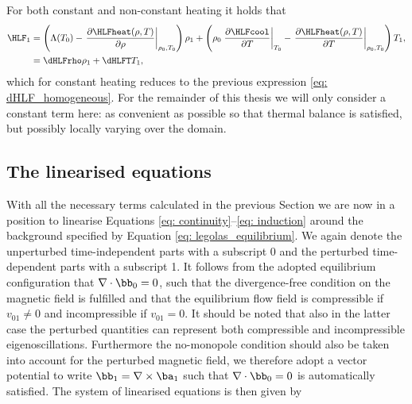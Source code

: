 For both constant and non-constant heating it holds that
\begin{equation} \label{eq: perturbed_HLF}
  \begin{aligned}
    \HLF_1 &= \left(
      \Lambda(T_0) - \left.\frac{\partial \HLFheat(\rho, T)}{\partial \rho}\right|_{\rho_0, T_0}
    \right)\rho_1 + \left(
      \rho_0 \left.\frac{\partial \HLFcool}{\partial T}\right|_{T_0}
      - \left.\frac{\partial \HLFheat(\rho, T)}{\partial T}\right|_{\rho_0, T_0}
    \right) T_1, \\
          &= \dHLFrho \rho_1 + \dHLFT T_1,
  \end{aligned}
\end{equation}
which for constant heating reduces to the previous expression \eqref{eq: dHLF_homogeneous}. For the remainder of this thesis we will only consider a constant term here: as convenient as possible so that thermal balance is satisfied, but possibly locally varying over the domain.

\subsection{The linearised equations}
With all the necessary terms calculated in the previous Section we are now in a position to linearise Equations \eqref{eq: continuity}--\eqref{eq: induction} around the background specified by Equation \eqref{eq: legolas_equilibrium}. We again denote the unperturbed time-independent parts with a subscript 0 and the perturbed time-dependent parts with a subscript 1. It follows from the adopted equilibrium configuration that $\nabla \cdot \bb_0 = 0$, such that the divergence-free condition on the magnetic field is fulfilled and that the equilibrium flow field is compressible if
$v_{01} \neq 0$ and incompressible if $v_{01} = 0$. It should be noted that also in the latter case the perturbed quantities can represent both compressible and incompressible eigenoscillations. Furthermore the no-monopole condition should also be taken into account for the perturbed magnetic field, we therefore adopt a vector potential to write $\bb_1 = \nabla \times \ba_1$ such that $\nabla \cdot \bb_0 = 0$ is automatically satisfied. The system of linearised equations is then given by


